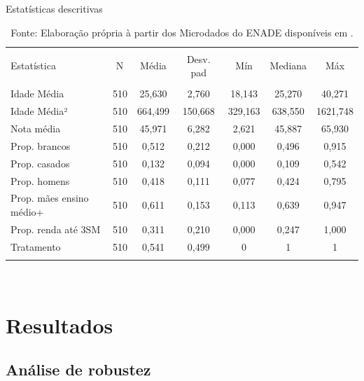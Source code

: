 \begin{table}[H] \centering 
  \caption{Estatísticas descritivas} 
  \label{tab:estatisticas_descritivas} 
\small 
\begin{tabular}{@{\extracolsep{5pt}}llccccc } 
\\[-1.8ex]\hline 
\hline \\[-1.8ex] 
Estatística & \multicolumn{1}{l}{\,\,N} & \multicolumn{1}{c}{Média} & \multicolumn{1}{c}{Desv. pad} & \multicolumn{1}{c}{Mín} & \multicolumn{1}{c}{Mediana} &  \multicolumn{1}{c}{Máx} \\ 
\hline \\[-1.8ex] 
Idade Média & 510 & 25,630 & 2,760 & 18,143 & 25,270 & 40,271 \\ 
Idade Média² & 510 & 664,499 & 150,668 & 329,163 & 638,550 & 1621,748 \\ 
Nota média & 510 & 45,971 & 6,282 & 2,621 & 45,887 & 65,930 \\ 
Prop. brancos & 510 & 0,512 & 0,212 & 0,000 & 0,496 & 0,915 \\ 
Prop. casados & 510 & 0,132 & 0,094 & 0,000 & 0,109 & 0,542 \\ 
Prop. homens & 510 & 0,418 & 0,111 & 0,077 & 0,424 & 0,795 \\ 
Prop. mães ensino médio+ & 510 & 0,611 & 0,153 & 0,113 & 0,639 & 0,947 \\ 
Prop. renda até 3SM & 510 & 0,311 & 0,210 & 0,000 & 0,247 & 1,000 \\ 
Tratamento & 510 & 0,541 & 0,499 & 0 & 1 & 1 \\ 
\hline \\[-1.8ex] 
\end{tabular} \\
\caption*{\RaggedRight Fonte: Elaboração própria à partir dos Microdados do ENADE disponíveis em \cite{INEP2020}.}
\end{table} 

\chapter{Resultados}

\section{Análise de robustez}

